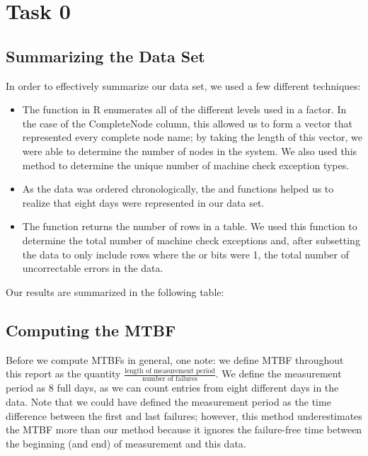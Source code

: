 \section{Task 0}

\subsection{Summarizing the Data Set}
In order to effectively summarize our data set, we used a few different techniques:

\begin{itemize}
\item The  function in R enumerates all of the different levels used in a factor.  In the case of the CompleteNode column, this allowed us to form a vector that represented every complete node name; by taking the length of this vector, we were able to determine the number of nodes in the system.  We also used this method to determine the unique number of machine check exception types.
\item As the data was ordered chronologically, the  and  functions helped us to realize that eight days were represented in our data set.
\item The  function returns the number of rows in a table.  We used this function to determine the total number of machine check exceptions and, after subsetting the data to only include rows where the  or  bits were 1, the total number of uncorrectable errors in the data.
\end{itemize}

Our results are summarized in the following table:

\subsection{Computing the MTBF}

Before we compute MTBFs in general, one note: we define MTBF throughout this report as the quantity $\frac{\textrm{length of measurement period}}{\textrm{number of failures}}$.  We define the measurement period as 8 full days, as we can count entries from eight different days in the data.  Note that we could have defined the measurement period as the time difference between the first and last failures; however, this method underestimates the MTBF more than our method because it ignores the failure-free time between the beginning (and end) of measurement and this data.

